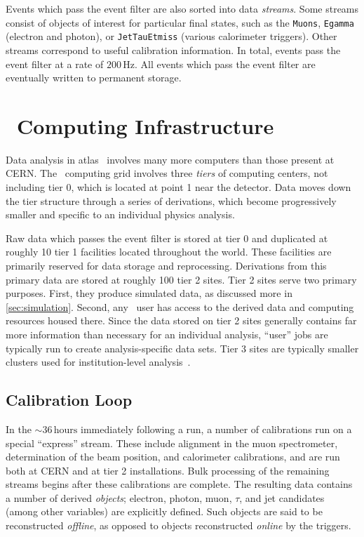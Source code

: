 Events which pass the event filter are also sorted into data \emph{streams}.
Some streams consist of objects of interest for particular final states, such as the \texttt{Muons}, \texttt{Egamma} (electron and photon), or \texttt{JetTauEtmiss} (various calorimeter triggers).
Other streams correspond to useful calibration information.
In total, events pass the event filter at a rate of $200\,\mathrm{Hz}$.
All events which pass the event filter are eventually written to permanent storage.

\section{\atlas\ Computing Infrastructure}
Data analysis in atlas \atlas\ involves many more computers than those present at CERN.
The \atlas\ computing grid involves three \emph{tiers} of computing centers, not including tier 0, which is located at point 1 near the detector.
Data moves down the tier structure through a series of derivations, which become progressively smaller and specific to an individual physics analysis.

Raw data which passes the event filter is stored at tier 0 and duplicated at roughly 10 tier 1 facilities located throughout the world.
These facilities are primarily reserved for data storage and reprocessing.
Derivations from this primary data are stored at roughly 100 tier 2 sites.
Tier 2 sites serve two primary purposes.
First, they produce simulated data, as discussed more in \cref{sec:simulation}.
Second, any \atlas\ user has access to the derived data and computing resources housed there.
Since the data stored on tier 2 sites generally contains far more information than necessary for an individual analysis, ``user'' jobs are typically run to create analysis-specific data sets.
Tier 3 sites are typically smaller clusters used for institution-level analysis~\cite{atlas-computing-tdr}.

\subsection{Calibration Loop}
In the $\sim 36\,\mathrm{hours}$ immediately following a run, a number of calibrations run on a special ``express'' stream.
These include alignment in the muon spectrometer, determination of the beam position, and calorimeter calibrations, and are run both at CERN and at tier 2 installations.
Bulk processing of the remaining streams begins after these calibrations are complete.
The resulting data contains a number of derived \emph{objects}; electron, photon, muon, $\tau$, and jet candidates (among other variables) are explicitly defined.
Such objects are said to be reconstructed \emph{offline}, as opposed to objects reconstructed \emph{online} by the triggers.

